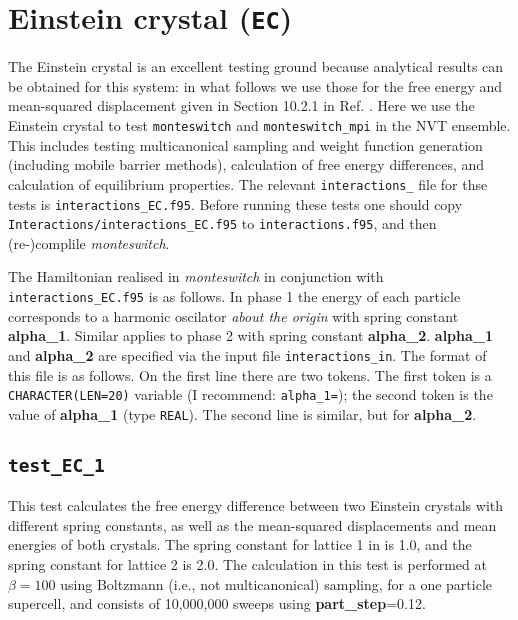 \documentclass{report}
\begin{document}
\section{Einstein crystal (\texttt{EC})}
The Einstein crystal is an excellent testing ground because analytical results can be obtained for this system:
in what follows we use those for the free energy and mean-squared displacement given in Section 10.2.1 in Ref.
\cite{book:Frenkel}. Here we use the Einstein crystal to test \texttt{monteswitch} and \texttt{monteswitch\_mpi}
in the NVT ensemble. This includes testing multicanonical sampling and weight function generation (including
mobile barrier methods), calculation of free energy differences, and calculation of equilibrium properties.
The relevant \texttt{interactions\_} file for thse tests is \texttt{interactions\_EC.f95}. Before running these 
tests one should copy \texttt{Interactions/interactions\_EC.f95} to \texttt{interactions.f95}, and then (re-)complile 
\emph{monteswitch}. 

The Hamiltonian realised in \emph{monteswitch} in conjunction with \texttt{interactions\_EC.f95} is 
as follows. In phase 1 the energy of each particle corresponds to a harmonic oscilator \emph{about the origin} with spring constant 
\textbf{alpha\_1}. Similar applies to phase 2 with spring constant \textbf{alpha\_2}. \textbf{alpha\_1} and \textbf{alpha\_2} 
are specified via the input file \texttt{interactions\_in}. The format of this file is as follows. On the first line there are two tokens. 
The first token is a \texttt{CHARACTER(LEN=20)} variable (I recommend: \texttt{alpha\_1=}); the second token is the 
value of \textbf{alpha\_1} (type \texttt{REAL}). The second line is similar, but for \textbf{alpha\_2}.


\subsection{\texttt{test\_EC\_1}}
This test calculates the free energy difference between two Einstein crystals with different spring constants,
as well as the mean-squared displacements and mean energies of both crystals. The spring constant for lattice 
1 in is 1.0, and the spring constant for lattice 2 is 2.0. The calculation in this test is 
performed at $\beta=100$ using Boltzmann (i.e., not multicanonical) sampling, for a one particle supercell, and 
consists of 10,000,000 sweeps using \textbf{part\_step}=0.12.
\end{document}
